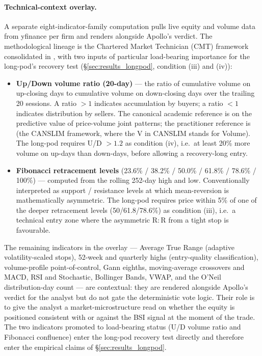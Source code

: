 \documentclass[11pt,a4paper]{article}
\begin{document}
\paragraph{Technical-context overlay.} A separate eight-indicator-family computation pulls live equity and volume data from yfinance per firm and renders alongside Apollo's verdict. The methodological lineage is the Chartered Market Technician (CMT) framework consolidated in \citet{kirkpatrick2015technical}, with two inputs of particular load-bearing importance for the long-pod's recovery test (§\ref{sec:results_longpod}, condition (iii) and (iv)):
\begin{itemize}
\item \textbf{Up/Down volume ratio (20-day)} --- the ratio of cumulative volume on up-closing days to cumulative volume on down-closing days over the trailing 20 sessions. A ratio $>1$ indicates accumulation by buyers; a ratio $<1$ indicates distribution by sellers. The canonical academic reference is \citet{lo2000foundations} on the predictive value of price-volume joint patterns; the practitioner reference is \citet{oneil2009make} (the CANSLIM framework, where the V in CANSLIM stands for Volume). The long-pod requires U/D $> 1.2$ as condition (iv), i.e.\ at least 20\% more volume on up-days than down-days, before allowing a recovery-long entry.
\item \textbf{Fibonacci retracement levels} (23.6\% / 38.2\% / 50.0\% / 61.8\% / 78.6\% / 100\%) --- computed from the rolling 252-day high and low. Conventionally interpreted as support / resistance levels at which mean-reversion is mathematically asymmetric. The long-pod requires price within 5\% of one of the deeper retracement levels (50/61.8/78.6\%) as condition (iii), i.e.\ a technical entry zone where the asymmetric R$:$R from a tight stop is favourable.
\end{itemize}
The remaining indicators in the overlay --- Average True Range (adaptive volatility-scaled stops), 52-week and quarterly highs (entry-quality classification), volume-profile point-of-control, Gann eighths, moving-average crossovers and MACD, RSI and Stochastic, Bollinger Bands, VWAP, and the O'Neil distribution-day count --- are contextual: they are rendered alongside Apollo's verdict for the analyst but do not gate the deterministic vote logic. Their role is to give the analyst a market-microstructure read on whether the equity is positioned consistent with or against the BSI signal at the moment of the trade. The two indicators promoted to load-bearing status (U/D volume ratio and Fibonacci confluence) enter the long-pod recovery test directly and therefore enter the empirical claims of §\ref{sec:results_longpod}.
\end{document}
